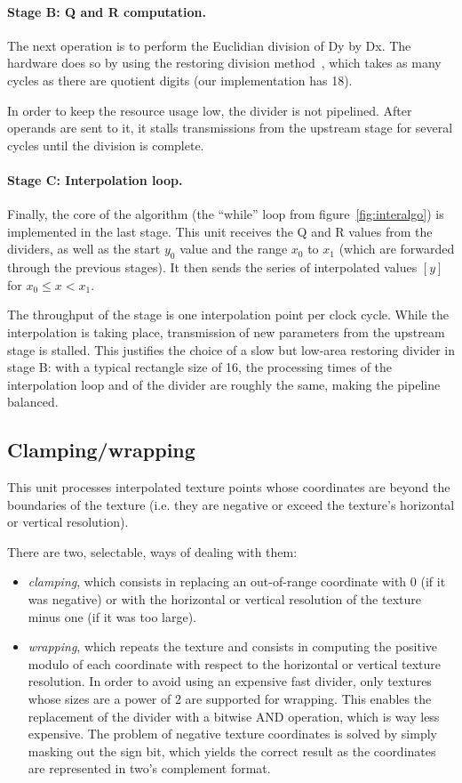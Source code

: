 \documentclass[a4paper,11pt]{kthesis}
\begin{document}
\paragraph{Stage B: Q and R computation.} The next operation is to perform the Euclidian division of Dy by Dx. The hardware does so by using the restoring division method~\cite{restdiv}, which takes as many cycles as there are quotient digits (our implementation has 18).

In order to keep the resource usage low, the divider is not pipelined. After operands are sent to it, it stalls transmissions from the upstream stage for several cycles until the division is complete.

\paragraph{Stage C: Interpolation loop.}
Finally, the core of the algorithm (the ``while'' loop from figure~\ref{fig:interalgo}) is implemented in the last stage. This unit receives the Q and R values from the dividers, as well as the start $y_{0}$ value and the range $x_{0}$ to $x_{1}$ (which are forwarded through the previous stages). It then sends the series of interpolated values $[y]$ for $x_{0} \leq x < x_{1}$.

The throughput of the stage is one interpolation point per clock cycle. While the interpolation is taking place, transmission of new parameters from the upstream stage is stalled. This justifies the choice of a slow but low-area restoring divider in stage B: with a typical rectangle size of 16, the processing times of the interpolation loop and of the divider are roughly the same, making the pipeline balanced.

\subsection{Clamping/wrapping}
This unit processes interpolated texture points whose coordinates are beyond the boundaries of the texture (i.e. they are negative or exceed the texture's horizontal or vertical resolution).

There are two, selectable, ways of dealing with them:
\begin{itemize}
\item \textit{clamping}, which consists in replacing an out-of-range coordinate with 0 (if it was negative) or with the horizontal or vertical resolution of the texture minus one (if it was too large).
\item \textit{wrapping}, which repeats the texture and consists in computing the positive modulo of each coordinate with respect to the horizontal or vertical texture resolution. In order to avoid using an expensive fast divider, only textures whose sizes are a power of 2 are supported for wrapping. This enables the replacement of the divider with a bitwise AND operation, which is way less expensive. The problem of negative texture coordinates is solved by simply masking out the sign bit, which yields the correct result as the coordinates are represented in two's complement format.
\end{itemize}
\end{document}
